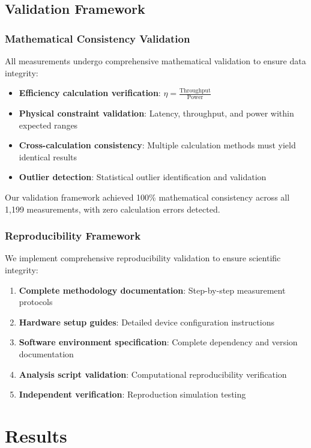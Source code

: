 \documentclass[manuscript]{acmart}
\begin{document}
\subsection{Validation Framework}

\subsubsection{Mathematical Consistency Validation}
All measurements undergo comprehensive mathematical validation to ensure data integrity:

\begin{itemize}
    \item \textbf{Efficiency calculation verification}: $\eta = \frac{\text{Throughput}}{\text{Power}}$
    \item \textbf{Physical constraint validation}: Latency, throughput, and power within expected ranges
    \item \textbf{Cross-calculation consistency}: Multiple calculation methods must yield identical results
    \item \textbf{Outlier detection}: Statistical outlier identification and validation
\end{itemize}

Our validation framework achieved 100\% mathematical consistency across all 1,199 measurements, with zero calculation errors detected.

\subsubsection{Reproducibility Framework}
We implement comprehensive reproducibility validation to ensure scientific integrity:

\begin{enumerate}
    \item \textbf{Complete methodology documentation}: Step-by-step measurement protocols
    \item \textbf{Hardware setup guides}: Detailed device configuration instructions
    \item \textbf{Software environment specification}: Complete dependency and version documentation
    \item \textbf{Analysis script validation}: Computational reproducibility verification
    \item \textbf{Independent verification}: Reproduction simulation testing
\end{enumerate}

\section{Results}
\end{document}
